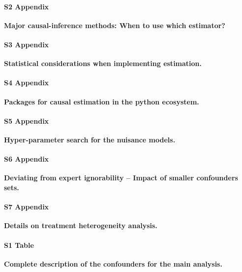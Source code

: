 \documentclass[10pt,letterpaper]{article}
\begin{document}
\paragraph*{S2 Appendix}
\label{apd:causal_estimators}
{\bf Major causal-inference methods: When to use which estimator?}

\paragraph*{S3 Appendix}
\label{apd:statistical_considerations}
{\bf Statistical considerations when implementing
  estimation.}

\paragraph*{S4 Appendix}
\label{apd:packages}
{\bf Packages for causal estimation in the python ecosystem.}

\paragraph*{S5 Appendix}
\label{apd:hyper_parameter_search}
{\bf Hyper-parameter search for the nuisance models.}

\paragraph*{S6 Appendix}
\label{apd:vibration_analysis_for_confounders}
{\bf Deviating from expert ignorability -- Impact of smaller confounders sets.}

\paragraph*{S7 Appendix}
\label{apd:hte}
{\bf Details on treatment heterogeneity analysis.}

\paragraph*{S1 Table}
\label{apd:albumin_for_sepsis:table1_complete}
{\bf Complete description of the confounders for the main analysis.}
\end{document}
